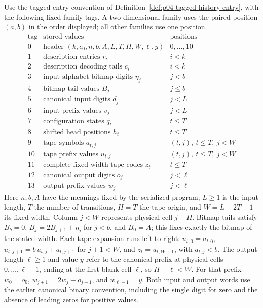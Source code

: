 \begin{definition}
\label{def:history-coding}
Use the tagged-entry convention of
Definition~\ref{def:p04-tagged-history-entry}, with the following fixed
family tags.  A two-dimensional family uses the paired position \((a,b)\)
in the order displayed; all other families use one position.
\[
\begin{array}{c|l|l}
 \text{tag}&\text{stored values}&\text{positions}\\ \hline
 0&\text{header }(k,c_0,n,b,A,L,T,H,W,\ell,y)&0,\ldots,10\\
 1&\text{description entries }r_i&i<k\\
 2&\text{description decoding tails }c_i&i<k\\
 3&\text{input-alphabet bitmap digits }\eta_j&j<b\\
 4&\text{bitmap tail values }B_j&j\leq b\\
 5&\text{canonical input digits }d_j&j<L\\
 6&\text{input prefix values }v_j&j<L\\
 7&\text{configuration states }q_t&t\leq T\\
 8&\text{shifted head positions }h_t&t\leq T\\
 9&\text{tape symbols }a_{t,j}&(t,j),\ t\leq T,\ j<W\\
 10&\text{tape prefix values }u_{t,j}&(t,j),\ t\leq T,\ j<W\\
 11&\text{complete fixed-width tape codes }z_t&t\leq T\\
 12&\text{canonical output digits }o_j&j<\ell\\
 13&\text{output prefix values }w_j&j<\ell
\end{array}
\]
Here \(n,b,A\) have the meanings fixed by the serialized program;
\(L\geq1\) is the input length, \(T\) the number of transitions,
\(H=T\) the tape origin, and \(W=L+2T+1\) its fixed width.
Column \(j<W\) represents physical cell \(j-H\).  Bitmap tails
satisfy \(B_b=0\), \(B_j=2B_{j+1}+\eta_j\) for \(j<b\),
and \(B_0=A\); this fixes exactly the bitmap of the stated width.
Each tape expansion runs left to right:
\(u_{t,0}=a_{t,0}\),
\(u_{t,j+1}=b\,u_{t,j}+a_{t,j+1}\) for \(j+1<W\), and
\(z_t=u_{t,W-1}\), with \(a_{t,j}<b\).
The output length \(\ell\geq1\) and value \(y\) refer to the
canonical prefix at physical cells \(0,\ldots,\ell-1\), ending
at the first blank cell \(\ell\), so \(H+\ell<W\).
For that prefix \(w_0=o_0\), \(w_{j+1}=2w_j+o_{j+1}\), and
\(w_{\ell-1}=y\).  Both input and output words use the earlier
canonical binary convention, including the single digit for zero and
the absence of leading zeros for positive values.


\end{definition}
